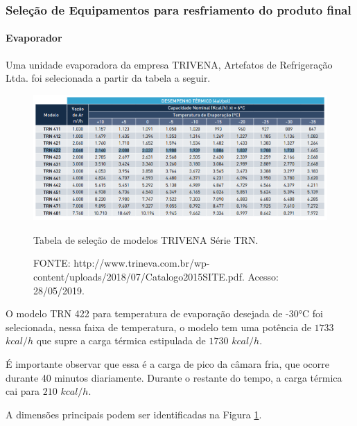 \documentclass[10pt,a4paper]{article}
\begin{document}
\newpage
\subsubsection{{Seleção de Equipamentos para resfriamento do produto final}}

\paragraph*{{ Evaporador}} 

Uma unidade evaporadora da empresa TRIVENA, Artefatos de Refrigeração Ltda. foi selecionada a partir da tabela a seguir.

\begin{figure}[h]
    \centering
    \includegraphics[scale = 0.9]{Figuras/Tabela_Catalogo_TRINEVA.png}
    \caption{Tabela de seleção de modelos TRIVENA Série TRN.}
    \caption*{FONTE: http://www.trineva.com.br/wp-content/uploads/2018/07/Catalogo2015SITE.pdf. Acesso: 28/05/2019.}
    \label{evaporador_produto_final}
\end{figure}

O modelo TRN 422 para temperatura de evaporação desejada de -30°C foi selecionada, nessa faixa de temperatura, o modelo tem uma potência de $1733$ $kcal/h$ que supre a carga térmica estipulada de $1730$ $kcal/h$.

É importante observar que essa é a carga de pico da câmara fria, que ocorre durante 40 minutos diariamente. Durante o restante do tempo, a carga térmica cai para $210$ $kcal/h$.

A dimensões principais podem ser identificadas na Figura \ref{evaporador_produto_final}.
\end{document}
